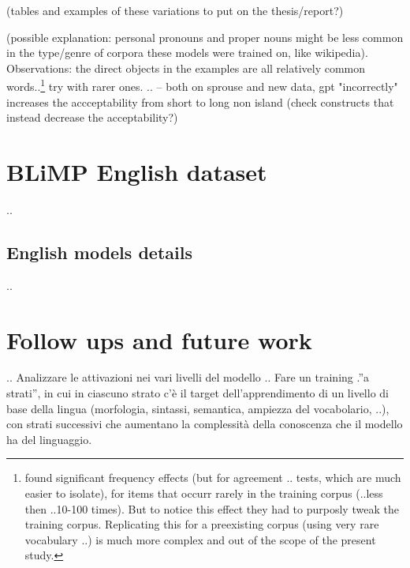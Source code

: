 (tables and examples of these variations to put on the thesis/report?)

(possible explanation: personal pronouns and proper nouns might be less common in the type/genre of corpora these models were trained on, like wikipedia).
Observations: the direct objects in the examples are all relatively common words..\footnote{\citet{wei2021frequency} found significant frequency effects (but for agreement .. tests, which are much easier to isolate), for items that occurr rarely in the training corpus (..less then ..10-100 times). But to notice this effect they had to purposly tweak the training corpus. Replicating this for a preexisting corpus (using very rare vocabulary ..) is much more complex and out of the scope of the present study.}
try with rarer ones.
..
-- both on sprouse and new data, gpt "incorrectly" increases the accceptability from short to long non island (check constructs that instead decrease the acceptability?)


\section{BLiMP English dataset}
..
\subsection{English models details}
..

\section{Follow ups and future work}





..
Analizzare le attivazioni nei vari livelli del modello ..
Fare un training .”a strati”, in cui in ciascuno strato c’è il target dell’apprendimento di un livello di base della lingua (morfologia, sintassi, semantica, ampiezza del vocabolario, ..), con strati successivi che aumentano la complessità della conoscenza che il modello ha del linguaggio.


